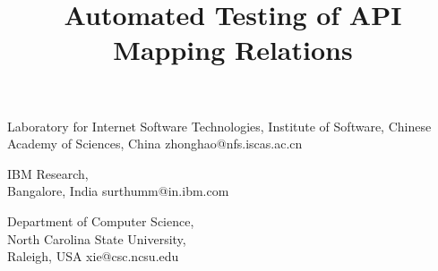 \documentclass[10pt,preprint]{sigplanconf}
\begin{document}
\copyrightdata{[to be supplied]}

\title{Automated Testing of API Mapping Relations}
{Laboratory for Internet Software Technologies, Institute of Software, Chinese Academy of Sciences, China}
{zhonghao@nfs.iscas.ac.cn}

{IBM Research, \\Bangalore, India}
{surthumm@in.ibm.com}

{Department of Computer Science, \\North Carolina State University, \\Raleigh, USA}
{xie@csc.ncsu.edu}

\maketitle
\end{document}

